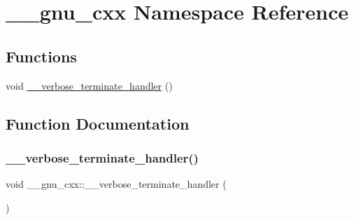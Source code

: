 \hypertarget{namespace____gnu__cxx}{}\section{\+\_\+\+\_\+gnu\+\_\+cxx Namespace Reference}
\label{namespace____gnu__cxx}
\subsection*{Functions}
\begin{DoxyCompactItemize}
\item 
void \mbox{\hyperlink{namespace____gnu__cxx_af51888cedbc669a114cd79e39e0cd9be}{\+\_\+\+\_\+verbose\+\_\+terminate\+\_\+handler}} ()
\end{DoxyCompactItemize}


\subsection{Function Documentation}
\mbox{\label{namespace____gnu__cxx_af51888cedbc669a114cd79e39e0cd9be}} 
\subsubsection{\texorpdfstring{\_\_verbose\_terminate\_handler()}{\_\_verbose\_terminate\_handler()}}
{\footnotesize\ttfamily void \+\_\+\+\_\+gnu\+\_\+cxx\+::\+\_\+\+\_\+verbose\+\_\+terminate\+\_\+handler (\begin{DoxyParamCaption}{ }\end{DoxyParamCaption})}

